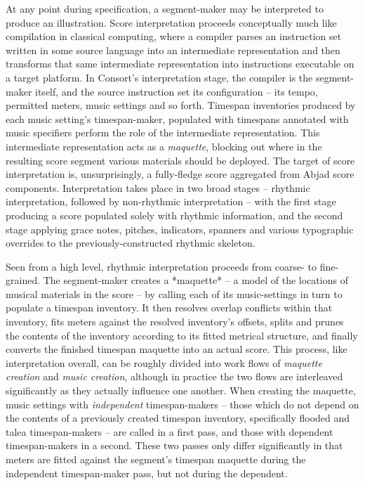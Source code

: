 At any point during specification, a segment-maker may be interpreted to
produce an illustration. Score interpretation proceeds conceptually much like
compilation in classical computing, where a compiler parses an instruction set
written in some source language into an intermediate representation and then
transforms that same intermediate representation into instructions executable
on a target platform. In Consort's interpretation stage, the compiler is the
segment-maker itself, and the source instruction set its configuration -- its
tempo, permitted meters, music settings and so forth. Timespan inventories
produced by each music setting's timespan-maker, populated with timespans
annotated with music specifiers perform the role of the intermediate
representation. This intermediate representation acts as a \emph{maquette},
blocking out where in the resulting score segment various materials should be
deployed. The target of score interpretation is, unsurprisingly, a fully-fledge
score aggregated from Abjad score components. Interpretation takes place in two
broad stages -- rhythmic interpretation, followed by non-rhythmic
interpretation -- with the first stage producing a score populated solely with
rhythmic information, and the second stage applying grace notes, pitches,
indicators, spanners and various typographic overrides to the
previously-constructed rhythmic skeleton.

Seen from a high level, rhythmic interpretation proceeds from coarse- to
fine-grained. The segment-maker creates a *maquette* -- a model of the locations
of musical materials in the score -- by calling each of its
music-settings in turn to populate a timespan inventory. It then resolves
overlap conflicts within that inventory, fits meters against the resolved
inventory's offsets, splits and prunes the contents of the inventory according
to its fitted metrical structure, and finally converts the finished timespan
maquette into an actual score. This process, like interpretation overall, can
be roughly divided into work flows of \emph{maquette creation} and \emph{music
creation}, although in practice the two flows are interleaved significantly as
they actually influence one another. When creating the maquette, music settings
with \emph{independent} timespan-makers -- those which do not depend on the
contents of a previously created timespan inventory, specifically flooded and
talea timespan-makers -- are called in a first pass, and those with {dependent}
timespan-makers in a second. These two passes only differ significantly in that
meters are fitted against the segment's timespan maquette during the
independent timespan-maker pass, but not during the dependent.

